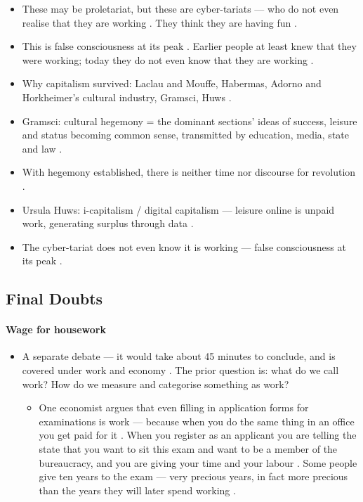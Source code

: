 \begin{CriticalPoint}
\begin{itemize}
    \item These may be proletariat, but these are cyber-tariats --- who do not even realise that they are working . They think they are having fun .
    \item This is false consciousness at its peak . Earlier people at least knew that they were working; today they do not even know that they are working .
\end{itemize}
\end{CriticalPoint}

\begin{QuickRevision}
\begin{itemize}
    \item Why capitalism survived: Laclau and Mouffe, Habermas, Adorno and Horkheimer's cultural industry, Gramsci, Huws .
    \item Gramsci: cultural hegemony = the dominant sections' ideas of success, leisure and status becoming common sense, transmitted by education, media, state and law .
    \item With hegemony established, there is neither time nor discourse for revolution .
    \item Ursula Huws: i-capitalism / digital capitalism --- leisure online is unpaid work, generating surplus through data .
    \item The cyber-tariat does not even know it is working --- false consciousness at its peak .
\end{itemize}
\end{QuickRevision}

\subsection{Final Doubts}

\paragraph{Wage for housework}
\begin{itemize}
    \item A separate debate --- it would take about 45 minutes to conclude, and is covered under work and economy . The prior question is: what do we call work?  How do we measure and categorise something as work? 
    \begin{itemize}
        \item One economist argues that even filling in application forms for examinations is work --- because when you do the same thing in an office you get paid for it . When you register as an applicant you are telling the state that you want to sit this exam and want to be a member of the bureaucracy, and you are giving your time and your labour . Some people give ten years to the exam --- very precious years, in fact more precious than the years they will later spend working .
    \end{itemize}
\end{itemize}

